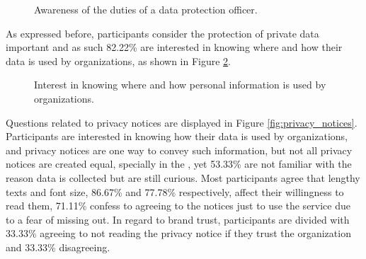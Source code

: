 \begin{figure}[H]
    \centering
    \caption{Awareness of the duties of a data protection officer.}
    \label{fig:aware_dpo}
\end{figure}

As expressed before, participants consider the protection of private data important
and as such 82.22\% are interested in knowing where and how their data is used by
organizations, as shown in Figure \ref{fig:interested_where_how_information_used}.

\begin{figure}
    \centering
    \caption{Interest in knowing where and how personal information is used by organizations.}
    \label{fig:interested_where_how_information_used}
\end{figure}

Questions related to privacy notices are displayed in Figure \ref{fig:privacy_notices}.
Participants are interested in knowing how their data is used by organizations,
and privacy notices are one way to convey such information, but not all privacy
notices are created equal, specially in the \hyperlink{\acronym}{\acronym}, yet 53.33\% are not familiar with
the reason data is collected but are still curious. Most participants agree that
lengthy texts and font size, 86.67\% and 77.78\% respectively, affect their
willingness to read them, 71.11\% confess to agreeing to the notices just to use
the service due to a fear of missing out. In regard to brand trust, participants
are divided with 33.33\% agreeing to not reading the privacy notice if they trust
the organization and 33.33\% disagreeing.

